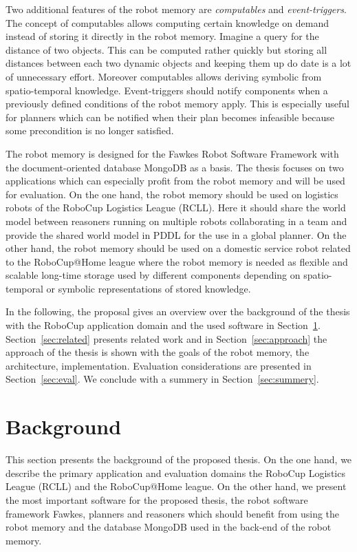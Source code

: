 \documentclass[a4paper,11pt]{article}
\newcommand{\refsec}[1]{Section~\ref{#1}}
\begin{document}
Two additional features of the robot memory are
\emph{computables} and
\emph{event-triggers}.  The concept of computables allows
computing certain knowledge on demand instead of storing it directly
in the robot memory. Imagine a query for the distance of two
objects. This can be computed rather quickly but storing all distances
between each two dynamic objects and keeping them up do date is a lot
of unnecessary effort. Moreover computables allows deriving
symbolic from spatio-temporal knowledge.  Event-triggers should notify
components when a previously defined conditions of the robot memory
apply. This is especially useful for planners which can be notified
when their plan becomes infeasible because some precondition is no
longer satisfied.

The robot memory is designed for the Fawkes Robot Software Framework
with the document-oriented database MongoDB as a basis.  The thesis
focuses on two applications which can especially profit from the robot
memory and will be used for evaluation. On the one hand, the robot
memory should be used on logistics robots of the RoboCup Logistics
League (RCLL). Here it should share the world model between reasoners
running on multiple robots collaborating in a team and provide the
shared world model in PDDL for the use in a global planner. On the
other hand, the robot memory should be used on a domestic service
robot related to the RoboCup@Home league where the robot memory is
needed as flexible and scalable long-time storage used by different
components depending on spatio-temporal or symbolic representations of
stored knowledge.

In the following, the proposal gives an overview over the background
of the thesis with the RoboCup application domain and the used
software in \refsec{sec:background}. \refsec{sec:related} presents
related work and in \refsec{sec:approach} the approach of the thesis
is shown with the goals of the robot memory, the architecture,
implementation. Evaluation considerations are presented in \refsec{sec:eval}.
We conclude with a summery in \refsec{sec:summery}.


\section{Background}
\label{sec:background}
This section presents the background of the proposed thesis. On the
one hand, we describe the primary application and evaluation domains
the RoboCup Logistics League (RCLL) and the RoboCup@Home league.
On the other hand, we present
the most important software for the proposed thesis,
the robot software framework Fawkes, planners and
reasoners which should benefit from using the robot memory and
the database MongoDB used in the back-end of the robot memory.
\end{document}
